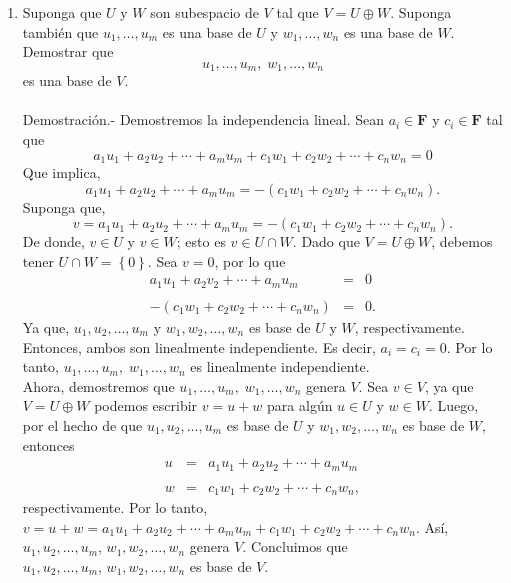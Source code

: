 \begin{enumerate}[\bfseries 1.]
    \item Suponga que $U$ y $W$ son subespacio de $V$ tal que $V=U\oplus W$. Suponga también que $u_1,\ldots,u_m$ es una base de $U$ y $w_1,\ldots,w_n$ es una base de $W$. Demostrar que 
    $$u_1,\ldots,u_m,\; w_1,\ldots,w_n$$
    es una base de $V$.\\\\
	Demostración.-\; Demostremos la independencia lineal. Sean $a_i\in \textbf{F}$ y $c_i\in \textbf{F}$ tal que
	$$a_1u_1+a_2u_2+\cdots+a_mu_m+c_1w_1+c_2w_2+\cdots+c_nw_n=0$$
	Que implica,
	$$a_1u_1+a_2u_2+\cdots+a_mu_m=-(c_1w_1+c_2w_2+\cdots+c_nw_n).$$
	Suponga que,
	$$v=a_1u_1+a_2u_2+\cdots+a_mu_m=-(c_1w_1+c_2w_2+\cdots+c_nw_n).$$
	De donde, $v\in U$ y $v\in W$; esto es $v\in U\cap W.$ Dado que $V=U\oplus W$, debemos tener $U\cap W=\left\{0\right\}$. Sea $v=0$, por lo que
	$$
	\begin{array}{rcl}
	    a_1u_1+a_2v_2+\cdots + a_mu_m &=& 0\\\\
	    -(c_1w_1+c_2w_2+\cdots + c_nw_n) &=& 0.
	\end{array}
	$$
	Ya que, $u_1,u_2,\ldots,u_m$ y $w_1,w_2,\ldots,w_n$ es base de $U$ y $W$, respectivamente. Entonces, ambos son linealmente independiente. Es decir, $a_i=c_i=0$. Por lo tanto, $u_1,\ldots,u_m,\; w_1,\ldots,w_n$ es linealmente independiente.\\
	Ahora, demostremos que $u_1,\ldots,u_m,\; w_1,\ldots,w_n$ genera $V$. Sea $v\in V$, ya que $V=U\oplus W$ podemos escribir $v=u+w$ para algún $u\in U$ y $w\in W$. Luego, por el hecho de que $u_1,u_2,\ldots,u_m$ es base de $U$ y $w_1,w_2,\ldots,w_n$ es base de $W$, entonces
	$$
	\begin{array}{rcl}
	    u &=& a_1u_1+a_2u_2+\cdots+a_mu_m\\\\
	    w &=& c_1w_1+c_2w_2+\cdots+c_nw_n,
	\end{array}
	$$
	respectivamente. Por lo tanto, $v=u+w=a_1u_1+a_2u_2+\cdots+a_mu_m+c_1w_1+c_2w_2+\cdots+c_nw_n$. Así, $u_1,u_2,\ldots,u_m,\, w_1,w_2,\ldots,w_n$ genera $V$. Concluimos que  $u_1,u_2,\ldots,u_m,\, w_1,w_2,\ldots,w_n$ es base de $V$.\\\\

\end{enumerate}



